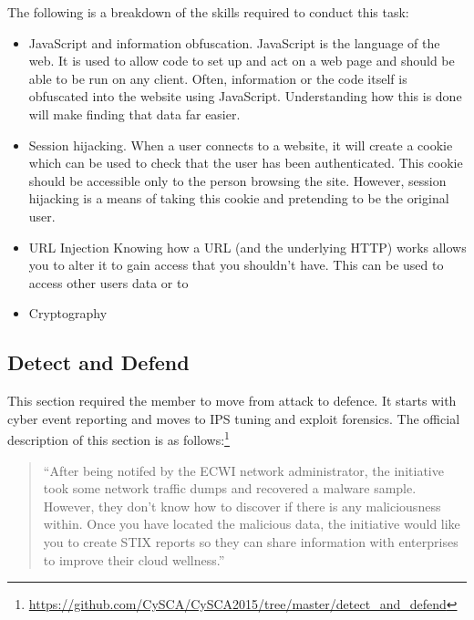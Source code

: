 \documentclass[a4paper,11pt]{report}
\begin{document}
			The following is a breakdown of the skills required to conduct this task:
			\begin{itemize}
				\item JavaScript and information obfuscation. 
					JavaScript is the language of the web. It is used to allow code to set up and act on a web page and should be able to be run on any client. 
					Often, information or the code itself is obfuscated into the website using JavaScript.
					Understanding how this is done will make finding that data far easier. 
				\item Session hijacking.
					When a user connects to a website, it will create a cookie which can be used to check that the user has been authenticated. 
					This cookie should be accessible only to the person browsing the site. 
					However, session hijacking is a means of taking this cookie and pretending to be the original user. 
				\item URL Injection
					Knowing how a URL (and the underlying HTTP) works allows you to alter it to gain access that you shouldn't have. 
					This can be used to access other users data or to 
				\item Cryptography
			\end{itemize}
		\subsection{Detect and Defend}
			This section required the member to move from attack to defence. 
			It starts with cyber event reporting and moves to IPS tuning and exploit forensics. 
			The official description of this section is as follows:\footnote{\url{https://github.com/CySCA/CySCA2015/tree/master/detect\_and\_defend}}
			\begin{quote}
				``After being notifed by the ECWI network administrator, 
				the initiative took some network traffic dumps and recovered a malware sample. 
				However, they don't know how to discover if there is any maliciousness within.
				Once you have located the malicious data, 
				the initiative would like you to create STIX reports so they can share information 
				with enterprises to improve their cloud wellness.''
			\end{quote}
			
\end{document}
